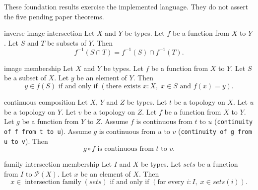 These foundation results exercise the implemented language.
They do not assert the five pending paper theorems.
\par

\begin{cleanresult}{inverse image intersection}
Let $X$ and $Y$ be types.
Let $f$ be a function from $X$ to $Y$.
Let $S$ and $T$ be subsets of $Y$.
Then \[f^{-1}(S\cap T)=f^{-1}(S)\cap f^{-1}(T).\]
\end{cleanresult}

\begin{cleanresult}{image membership}
Let $X$ and $Y$ be types.
Let $f$ be a function from $X$ to $Y$.
Let $S$ be a subset of $X$.
Let $y$ be an element of $Y$.
Then \[y\in f(S)\text{ if and only if }\left(\text{there exists }x : X,\; x\in S\text{ and }f(x)=y\right).\]
\end{cleanresult}

\begin{cleanresult}{continuous composition}
Let $X$, $Y$ and $Z$ be types.
Let $t$ be a topology on $X$.
Let $u$ be a topology on $Y$.
Let $v$ be a topology on $Z$.
Let $f$ be a function from $X$ to $Y$.
Let $g$ be a function from $Y$ to $Z$.
Assume $f\text{ is continuous from }t\text{ to }u$ (\texttt{continuity of f from t to u}).
Assume $g\text{ is continuous from }u\text{ to }v$ (\texttt{continuity of g from u to v}).
Then \[g \circ f\text{ is continuous from }t\text{ to }v.\]
\end{cleanresult}

\begin{cleanresult}{family intersection membership}
Let $I$ and $X$ be types.
Let $\mathit{sets}$ be a function from $I$ to $\mathcal{P}(X)$.
Let $x$ be an element of $X$.
Then \[x\in \operatorname{intersection\ family}(\mathit{sets})\text{ if and only if }\left(\text{for every }i : I,\; x\in \mathit{sets}(i)\right).\]
\end{cleanresult}

